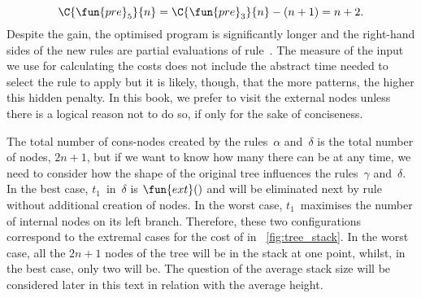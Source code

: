 \begin{equation*}
\C{\fun{pre}_5}{n} = \C{\fun{pre}_3}{n} - (n+1) = n +
2.
\end{equation*}
Despite the gain, the optimised program is significantly longer and
the right\hyp{}hand sides of the new rules are partial
evaluations of
rule~\clause{\delta}. The measure of the input we use for calculating
the costs does not include the abstract time needed to select the rule
to apply but it is likely, though, that the more patterns, the higher
this hidden penalty. In this book, we prefer to visit the external
nodes unless there is a logical reason not to do so, if only for the
sake of conciseness.

The total number of cons\hyp{}nodes created by the
rules~\(\alpha\) and~\(\delta\) is the total number of nodes,
\(2n+1\), but if we want to know how many there can be at any time, we
need to consider how the shape of the original tree influences the
rules~\(\gamma\) and~\(\delta\). In the best case,
\(t_1\)~in~\(\delta\) is \(\fun{ext}()\) and will be eliminated next
by rule~\clause{\gamma} without additional creation of nodes. In the
worst case, \(t_1\)~maximises the number of internal nodes on its left
branch. Therefore, these two configurations correspond to the extremal
cases for the cost of 
in \fig~\vref{fig:tree_stack}. In the worst case, all the \(2n+1\)
nodes of the tree will be in the stack at one point, whilst, in the
best case, only two will be. The question of the average stack size
will be considered later in this text in relation with the average
height.

